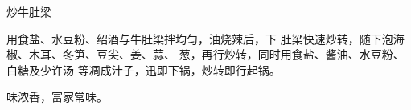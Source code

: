 \begin{recipe}{炒牛肚梁}

\ingredients



\cooking

用食盐、水豆粉、绍酒与牛肚梁拌均匀，油烧辣后，下 肚梁快速炒转，随下泡海椒、木耳、冬笋、豆尖、姜、蒜、 葱，再行炒转，同时用食盐、酱油、水豆粉、白糖及少许汤 等凋成汁子，迅即下锅，炒转即行起锅。

\notes

味浓香，富家常味。

\end{recipe}

